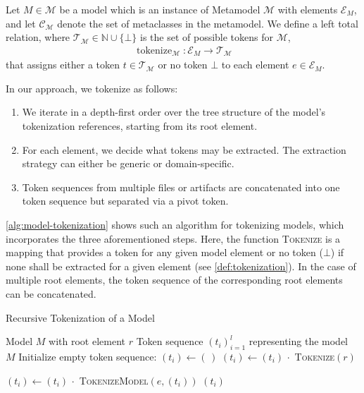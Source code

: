 \begin{theorem}[Tokenization]\label{def:tokenization}
Let \(M \in \mathcal{M}\) be a model which is an instance of Metamodel \(\mathcal{M}\) with elements \(\mathcal{E}_M\), and let \(\mathcal{C}_\mathcal{M}\) denote the set of metaclasses in the metamodel.
We define a left total relation, where \( \mathcal{T}_\mathcal{M} \in \mathbb{N} \cup \{\bot\} \) is the set of possible tokens for \(\mathcal{M}\),
\begin{align*}
    \operatorname{tokenize}_\mathcal{M}: \mathcal{E}_M \rightarrow \mathcal{T}_\mathcal{M}
\end{align*}
that assigns either a token \( t \in \mathcal{T}_\mathcal{M} \) or no token \( \bot \) to each element \( e \in \mathcal{E}_M \).
\end{theorem}

In our approach, we tokenize as follows:
\begin{enumerate}
    \item We iterate in a depth-first order over the tree structure of the model's tokenization references, starting from its root element.
    \item For each element, we decide what tokens may be extracted. The extraction strategy can either be generic or domain-specific.
    \item Token sequences from multiple files or artifacts are concatenated into one token sequence but separated via a pivot token.
\end{enumerate}

\autoref{alg:model-tokenization} shows such an algorithm for tokenizing models, which incorporates the three aforementioned steps.
Here, the function \textsc{Tokenize} is a mapping that provides a token for any given model element or no token (\(\bot\)) if none shall be extracted for a given element (see \autoref{def:tokenization}).
In the case of multiple root elements, the token sequence of the corresponding root elements can be concatenated.

\begin{algorithm}[H]
\caption{Recursive Tokenization of a Model}
\label{alg:model-tokenization}
\begin{algorithmic}[1]
\Require Model $M$ with root element $r$
\Ensure Token sequence \((t_i)_{i=1}^{l}\) representing the model $M$
\State Initialize empty token sequence: $(t_i) \gets (\,)$
    \State $(t_i) \gets (t_i) \, \cdot$ \textsc{Tokenize}$(r)$

        \State $(t_i) \gets (t_i) \, \cdot$ \textsc{TokenizeModel}$(e, (t_i))$
    \EndFor
    \State \Return $(t_i)$
\EndFunction
\end{algorithmic}
\end{algorithm}

